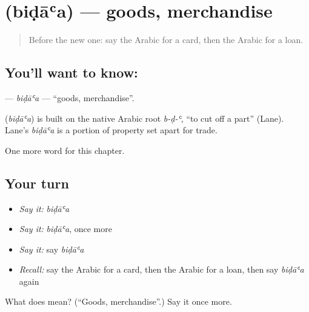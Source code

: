 \section[\texorpdfstring{\ar{بضاعة} (biḍāʿa)}{بضاعة (biḍāʿa)}]{ (biḍāʿa) — goods, merchandise}

\label{lesson:AR-C220-bidaa}



\begin{quote}
Before the new one: say the Arabic for a card, then the Arabic for a loan.
\end{quote}

\subsection*{You'll want to know: }
\textbf{} — \emph{biḍāʿa} — \textquotedblleft{}goods, merchandise\textquotedblright{}.

\begin{cousinweb}
\textbf{} (\emph{biḍāʿa}) is built on the native Arabic root \emph{b-ḍ-ʿ}, \textquotedblleft{}to cut off a part\textquotedblright{} (Lane). Lane's \emph{biḍāʿa} is a portion of property set apart for trade.
\end{cousinweb}

\begin{grammarlens}[title={What you've built}]
One more word for this chapter.
\end{grammarlens}

\subsection*{Your turn}
\begin{itemize}
\raggedright
  \item \emph{Say it:} \emph{biḍāʿa}
  \item \emph{Say it:} \emph{biḍāʿa}, once more
  \item \emph{Say it:} say \emph{biḍāʿa}
  \item \emph{Recall:} say the Arabic for a card, then the Arabic for a loan, then say \emph{biḍāʿa} again
\end{itemize}

\begin{tcolorbox}[breakable,colback=teal!4,colframe=teal!35!black,title={Before you move on}]
What does  mean? (\textquotedblleft{}Goods, merchandise\textquotedblright{}.) Say it once more.
\end{tcolorbox}
